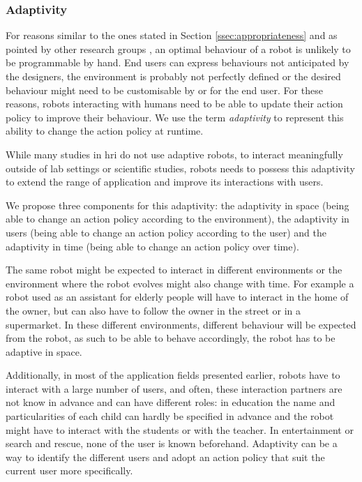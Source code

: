 \subsubsection{Adaptivity}	\label{ssec:adap}
    For reasons similar to the ones stated in Section \ref{ssec:appropriateness} and as pointed by other research groups \citep{argall2009survey, hoffman2016openwoz}, an optimal behaviour of a robot is unlikely to be programmable by hand. End users can express behaviours not anticipated by the designers, the environment is probably not perfectly defined or the desired behaviour might need to be customisable by or for the end user. For these reasons, robots interacting with humans need to be able to update their action policy to improve their behaviour. We use the term \emph{adaptivity} to represent this ability to change the action policy at runtime. 
    
    While many studies in \gls{hri} do not use adaptive robots, to interact meaningfully outside of lab settings or scientific studies, robots needs to possess this adaptivity to extend the range of application and improve its interactions with users.  
    
    We propose three components for this adaptivity: the adaptivity in space (being able to change an action policy according to the environment), the adaptivity in users (being able to change an action policy according to the user) and the adaptivity in time (being able to change an action policy over time).

    The same robot might be expected to interact in different environments or the environment where the robot evolves might also change with time. For example a robot used as an assistant for elderly people will have to interact in the home of the owner, but can also have to follow the owner in the street or in a supermarket. In these different environments, different behaviour will be expected from the robot, as such to be able to behave accordingly, the robot has to be adaptive in space.

    Additionally, in most of the application fields presented earlier, robots have to interact with a large number of users, and often, these interaction partners are not know in advance and can have different roles: in education the name and particularities of each child can hardly be specified in advance and the robot might have to interact with the students or with the teacher. In entertainment or search and rescue, none of the user is known beforehand. Adaptivity can be a way to identify the different users and adopt an action policy that suit the current user more specifically. %

